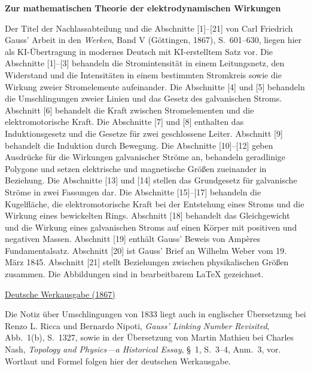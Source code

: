 \clearpage
{}
\thispagestyle{empty}
\begin{center}\Large\textbf{Zur mathematischen Theorie der elektrodynamischen Wirkungen}\end{center}

Der Titel der Nachlassabteilung und die Abschnitte [1]--[21] von Carl Friedrich Gauss’ Arbeit in den \textit{Werken}, Band V (Göttingen, 1867), S.~601--630, liegen hier als KI-Übertragung in modernes Deutsch mit KI-erstelltem Satz vor. Die Abschnitte [1]--[3] behandeln die Stromintensität in einem Leitungsnetz, den Widerstand und die Intensitäten in einem bestimmten Stromkreis sowie die Wirkung zweier Stromelemente aufeinander. Die Abschnitte [4] und [5] behandeln die Umschlingungen zweier Linien und das Gesetz des galvanischen Stroms. Abschnitt [6] behandelt die Kraft zwischen Stromelementen und die elektromotorische Kraft. Die Abschnitte [7] und [8] enthalten das Induktionsgesetz und die Gesetze für zwei geschlossene Leiter. Abschnitt [9] behandelt die Induktion durch Bewegung. Die Abschnitte [10]--[12] geben Ausdrücke für die Wirkungen galvanischer Ströme an, behandeln geradlinige Polygone und setzen elektrische und magnetische Größen zueinander in Beziehung. Die Abschnitte [13] und [14] stellen das Grundgesetz für galvanische Ströme in zwei Fassungen dar. Die Abschnitte [15]--[17] behandeln die Kugelfläche, die elektromotorische Kraft bei der Entstehung eines Stroms und die Wirkung eines bewickelten Rings. Abschnitt [18] behandelt das Gleichgewicht und die Wirkung eines galvanischen Stroms auf einen Körper mit positiven und negativen Massen. Abschnitt [19] enthält Gauss’ Beweis von Ampères Fundamentalsatz. Abschnitt [20] ist Gauss’ Brief an Wilhelm Weber vom 19. März 1845. Abschnitt [21] stellt Beziehungen zwischen physikalischen Größen zusammen. Die Abbildungen sind in bearbeitbarem \LaTeX{} gezeichnet.

\medskip\noindent
\href{https://gdz.sub.uni-goettingen.de/id/PPN236006339}{Deutsche Werkausgabe (1867)}

Die Notiz über Umschlingungen von 1833 liegt auch in englischer Übersetzung bei Renzo L. Ricca und Bernardo Nipoti, \textit{Gauss’ Linking Number Revisited}, Abb.~1(b), S.~1327, sowie in der Übersetzung von Martin Mathieu bei Charles Nash, \textit{Topology and Physics---a Historical Essay}, §~1, S.~3--4, Anm.~3, vor. Wortlaut und Formel folgen hier der deutschen Werkausgabe.

